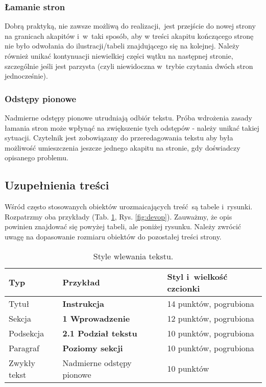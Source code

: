 \subsubsection{Łamanie stron}
\label{subsubsec:pagebreak}

Dobrą praktyką, nie zawsze możliwą do realizacji, jest przejście do nowej strony na granicach akapitów i~w~taki sposób, aby w treści akapitu kończącego stronę nie było odwołania do ilustracji/tabeli znajdującego się na kolejnej. Należy również unikać kontynuacji niewielkiej części wątku na następnej stronie, szczególnie jeśli jest parzysta (czyli niewidoczna w~trybie czytania dwóch stron jednocześnie).

\subsubsection{Odstępy pionowe}
\label{subsubsec:verticalSpace}

Nadmierne odstępy pionowe utrudniają odbiór tekstu. Próba wdrożenia zasady łamania stron może wpłynąć na zwiększenie tych odstępów - należy unikać takiej sytuacji. Czytelnik jest zobowiązany do przeredagowania tekstu aby była możliwość umieszczenia jeszcze jednego akapitu na stronie, gdy doświadczy opisanego problemu.

\subsection{Uzupełnienia treści}
\label{subsec:additions}

Wśród często stosowanych obiektów urozmaicających treść są tabele i~rysunki. Rozpatrzmy oba przykłady (Tab. \ref{tab:styles}, Rys. \ref{fig:devop}). Zauważmy, że opis powinien znajdować się powyżej tabeli, ale poniżej rysunku. Należy zwrócić uwagę na dopasowanie rozmiaru obiektów do pozostałej treści strony.

\begin{table}
	\vspace{-4mm}
	\caption{
		Style wlewania tekstu.
	}
	\begin{center}
		\begin{tabular}{lll}
			\hline
			Typ & Przykład & Styl i~wielkość czcionki\\
			\hline
			Tytuł & {\Large\bfseries Instrukcja} & 14 punktów, pogrubiona\\
			Sekcja &  {\large\bfseries 1 Wprowadzenie} & 12 punktów, pogrubiona\\
			Podsekcja & {\bfseries 2.1 Podział tekstu} & 10 punktów, pogrubiona\\
			Paragraf & {\bfseries Poziomy sekcji} & 10 punktów, pogrubiona\\
			Zwykły tekst & Nadmierne odstępy pionowe & 10 punktów\\
			\hline
		\end{tabular}
	\end{center}
	\label{tab:styles}
	\vspace{-6mm}
\end{table}

